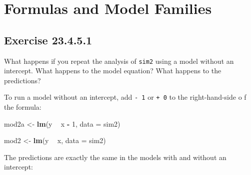 \documentclass[]{book}
\newenvironment{Shaded}{\begin{snugshade}}{\end{snugshade}}
\newcommand{\CommentTok}[1]{\textcolor[rgb]{0.56,0.35,0.01}{\textit{#1}}}
\newcommand{\DataTypeTok}[1]{\textcolor[rgb]{0.13,0.29,0.53}{#1}}
\newcommand{\DecValTok}[1]{\textcolor[rgb]{0.00,0.00,0.81}{#1}}
\newcommand{\KeywordTok}[1]{\textcolor[rgb]{0.13,0.29,0.53}{\textbf{#1}}}
\newcommand{\NormalTok}[1]{#1}
\newcommand{\OperatorTok}[1]{\textcolor[rgb]{0.81,0.36,0.00}{\textbf{#1}}}
\newcommand{\StringTok}[1]{\textcolor[rgb]{0.31,0.60,0.02}{#1}}
\theoremstyle{plain}
\theoremstyle{remark}
\begin{document}
\hypertarget{formulas-and-model-families}{%
\section{Formulas and Model Families}\label{formulas-and-model-families}}

\hypertarget{exercise-23.4.5.1}{%
\subsection*{\texorpdfstring{Exercise {23.4.5.1}}{Exercise 23.4.5.1}}\label{exercise-23.4.5.1}}

What happens if you repeat the analysis of \texttt{sim2} using a model without an intercept. What happens to the model equation?
What happens to the predictions?

To run a model without an intercept, add \texttt{-\ 1} or \texttt{+\ 0} to the right-hand-side o f the formula:

\begin{Shaded}
\begin{Highlighting}[]
\NormalTok{mod2a <-}\StringTok{ }\KeywordTok{lm}\NormalTok{(y }\OperatorTok{~}\StringTok{ }\NormalTok{x }\OperatorTok{-}\StringTok{ }\DecValTok{1}\NormalTok{, }\DataTypeTok{data =}\NormalTok{ sim2)}
\end{Highlighting}
\end{Shaded}

\begin{Shaded}
\begin{Highlighting}[]
\NormalTok{mod2 <-}\StringTok{ }\KeywordTok{lm}\NormalTok{(y }\OperatorTok{~}\StringTok{ }\NormalTok{x, }\DataTypeTok{data =}\NormalTok{ sim2)}
\end{Highlighting}
\end{Shaded}

The predictions are exactly the same in the models with and without an intercept:

\begin{Shaded}
\end{Shaded}
\end{document}
